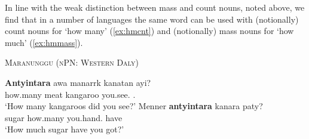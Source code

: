 \documentclass[12pt,egregdoesnotlikesansseriftitles]{scrartcl}
\begin{document}
In line with the weak distinction between mass and count nouns, noted above, we find that in a number of languages the same word can be used with (notionally) count nouns for `how many' (\ref{ex:hmcnt}) and (notionally) mass nouns for `how much' (\ref{ex:hmmass}).
\begin{exe}
  \ex\textsc{Maranunggu (nPN: Western Daly)}\hfill {}
  \begin{xlist}
    \ex\label{ex:hmcnt}\gll \textbf{Antyintara} awa manarrk kanatan ayi?\\
    how.many meat kangaroo you.see.\Nfut{} \Pst.\Aux\\
    `How many kangaroos did you see?'
    \ex\label{ex:hmmass}\gll Menner \textbf{antyintara} kanara paty?\\
    sugar how.many you.hand.\Nfut{} have\\
    `How much sugar have you got?'
  \end{xlist}
\end{exe}

\printbibliography
\end{document}
